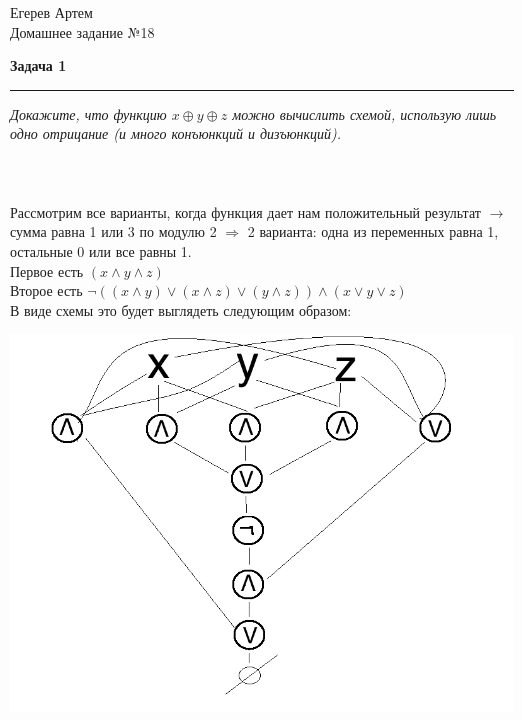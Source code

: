 \documentclass[11pt,a4paper]{scrartcl}
\begin{document}
\begin{flushright}
	Егерев Артем \\
	Домашнее задание №18 \\
\end{flushright}
\textbf{\Large Задача 1}
\medskip\hrule\medskip
\textsl{Докажите, что функцию  $ x \oplus y \oplus z $  можно вычислить схемой, использую лишь одно отрицание (и много конъюнкций и дизъюнкций).}
\\ \\
 \\ \\

\noindent Рассмотрим все варианты, когда функция дает нам положительный результат $ \rightarrow $ сумма равна 1 или 3 по модулю 2 $ \Rightarrow $ 2  варианта: одна из переменных равна 1, остальные 0 или все равны 1. \\
Первое есть $ (x \land y \land z) $ \\
Второе есть $ \neg((x \land y) \lor (x \land z) \lor (y \land z)) \land  (x \lor y \lor z)$ \\ 
В виде схемы это будет выглядеть следующим образом:
\begin{center}
	\includegraphics[height = 100mm]{1.png}
\end{center}
\newpage
\end{document}
